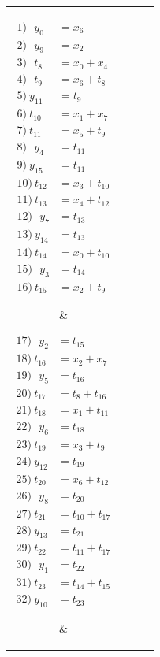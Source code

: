 {\scriptsize
\begin{tabular}{| c c | c c |} \hline
\parbox{0.2\linewidth}{%
\begin{align*}
1)\:\:\:y_0 & =  x_6\\ 
2)\:\:\:y_9 & =  x_2\\ 
3)\:\:\:t_8 & =  x_0 + x_4\\ 
4)\:\:\:t_9 & =  x_6 + t_8\\ 
5)\:y_{11} & =  t_9\\ 
6)\:t_{10} & =  x_1 + x_7\\ 
7)\:t_{11} & =  x_5 + t_9\\ 
8)\:\:\:y_4 & =  t_{11}\\ 
9)\:y_{15} & =  t_{11}\\ 
10)\:t_{12} & =  x_3 + t_{10}\\ 
11)\:t_{13} & =  x_4 + t_{12}\\ 
12)\:\:\:y_7 & =  t_{13}\\ 
13)\:y_{14} & =  t_{13}\\ 
14)\:t_{14} & =  x_0 + t_{10}\\ 
15)\:\:\:y_3 & =  t_{14}\\ 
16)\:t_{15} & =  x_2 + t_9
\end{align*}}
    & 
\parbox{0.2\linewidth}{%
\begin{align*}
17)\:\:\:y_2 & =  t_{15}\\ 
18)\:t_{16} & =  x_2 + x_7\\ 
19)\:\:\:y_5 & =  t_{16}\\ 
20)\:t_{17} & =  t_8 + t_{16}\\ 
21)\:t_{18} & =  x_{1} + t_{11}\\ 
22)\:\:\:y_6 & =  t_{18}\\ 
23)\:t_{19} & =  x_3 + t_9\\ 
24)\:y_{12} & =  t_{19}\\ 
25)\:t_{20} & =  x_6 + t_{12}\\ 
26)\:\:\:y_8 & =  t_{20}\\ 
27)\:t_{21} & =  t_{10} + t_{17}\\ 
28)\:y_{13} & =  t_{21}\\ 
29)\:t_{22} & =  t_{11} + t_{17}\\ 
30)\:\:\:y_1 & =  t_{22}\\ 
31)\:t_{23} & =  t_{14} + t_{15}\\ 
32)\:y_{10} & =  t_{23}
\end{align*}}
&  %


\end{tabular}}
